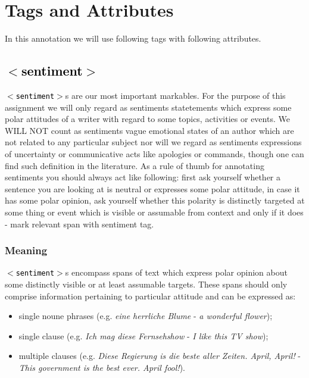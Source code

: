 \documentclass[11pt,a4paper]{article}
\newcommand{\xmltag}[1]{\textcolor{black}{{\small$<$#1$>$}}}
\begin{document}
\section{Tags and Attributes}
In this annotation we will use following tags with following
attributes.

\subsection{\xmltag{sentiment}}
\texttt{\xmltag{sentiment}}s are our most important markables.  For
the purpose of this assignment we will only regard as sentiments
statetements which express some polar attitudes of a writer with
regard to some topics, activities or events. We WILL NOT count as
sentiments vague emotional states of an author which are not related
to any particular subject nor will we regard as sentiments expressions
of uncertainty or communicative acts like apologies or commands,
though one can find such definition in the literature. As a rule of
thumb for annotating sentiments you should always act like following:
first ask yourself whether a sentence you are looking at is neutral or
expresses some polar attitude, in case it has some polar opinion, ask
yourself whether this polarity is distinctly targeted at some thing or
event which is visible or assumable from context and only if it does -
mark relevant span with sentiment tag.

\subsubsection{Meaning}

\texttt{\xmltag{sentiment}}s encompass spans of text which express
polar opinion about some distinctly visible or at least assumable
targets. These spans should only comprise information pertaining to
particular attitude and can be expressed as:
\begin{itemize}
  \item single noune phrases (e.g. \textit{eine herrliche Blume} -
    \textit{a wonderful flower});
  \item single clause (e.g. \textit{Ich mag diese Fernsehshow} -
    \textit{I like this TV show});
  \item multiple clauses (e.g. \textit{Diese Regierung is die beste
    aller Zeiten. April, April!} - \textit{This government is the best
    ever. April fool!}).
\end{itemize}
\end{document}
